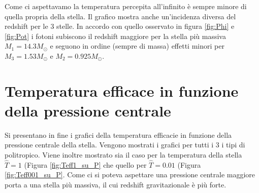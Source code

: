 \documentclass[a4paper, titlepage]{article}
\begin{document}
Come ci aspettavamo la temperatura percepita all'infinito è sempre minore di quella propria della stella.
Il grafico mostra anche un'incidenza diversa del redshift per le 3 stelle.
In accordo con quello osservato in figura \ref{fig:Phi} e \ref{fig:Pot} i fotoni subiscono il redshift maggiore per la stella più massiva $M_1 = 14.3 M_\odot$ e seguono in ordine (sempre di massa) effetti minori per $M_3 = 1.53 M_\odot$ e $M_2 = 0.925 M_\odot$.


\section{Temperatura efficace in funzione della pressione centrale}

Si presentano in fine i grafici della temperatura efficacie in funzione della
pressione centrale della stella.
Vengono mostrati i grafici per tutti i 3 i tipi di politropico.
Viene inoltre mostrato sia il caso per la temperatura della stella
$\hat T = 1$ (Figura \ref{fig:Teff1_su_P} che quello per $\hat T = 0.01$
(Figura \ref{fig:Teff001_su_P}.
Come ci si poteva aspettare una pressione centrale maggiore porta a una stella
più massiva, il cui redshift gravitazionale è più forte.
\end{document}
